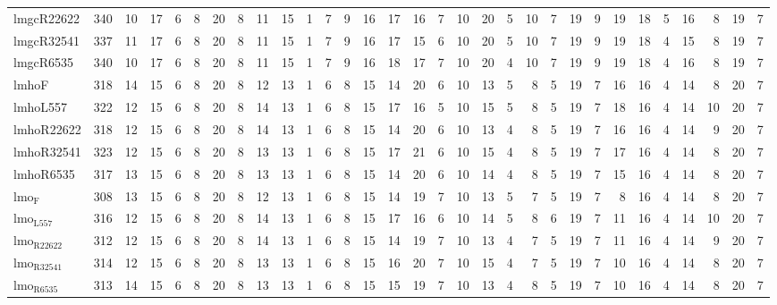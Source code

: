 \begin{center}
\begin{tabular}{lrrrrrrrrrrrrrrrrrrrrrrrrrrrrrr}
lmgcR22622 & 340 & 10 & 17 & 6 & 8 & 20 & 8 & 11 & 15 & 1 & 7 & 9 & 16 & 17 & 16 & 7 & 10 & 20 & 5 & 10 & 7 & 19 & 9 & 19 & 18 & 5 & 16 & 8 & 19 & 7\\
lmgcR32541 & 337 & 11 & 17 & 6 & 8 & 20 & 8 & 11 & 15 & 1 & 7 & 9 & 16 & 17 & 15 & 6 & 10 & 20 & 5 & 10 & 7 & 19 & 9 & 19 & 18 & 4 & 15 & 8 & 19 & 7\\
lmgcR6535 & 340 & 10 & 17 & 6 & 8 & 20 & 8 & 11 & 15 & 1 & 7 & 9 & 16 & 18 & 17 & 7 & 10 & 20 & 4 & 10 & 7 & 19 & 9 & 19 & 18 & 4 & 16 & 8 & 19 & 7\\
lmhoF & 318 & 14 & 15 & 6 & 8 & 20 & 8 & 12 & 13 & 1 & 6 & 8 & 15 & 14 & 20 & 6 & 10 & 13 & 5 & 8 & 5 & 19 & 7 & 16 & 16 & 4 & 14 & 8 & 20 & 7\\
lmhoL557 & 322 & 12 & 15 & 6 & 8 & 20 & 8 & 14 & 13 & 1 & 6 & 8 & 15 & 17 & 16 & 5 & 10 & 15 & 5 & 8 & 5 & 19 & 7 & 18 & 16 & 4 & 14 & 10 & 20 & 7\\
lmhoR22622 & 318 & 12 & 15 & 6 & 8 & 20 & 8 & 14 & 13 & 1 & 6 & 8 & 15 & 14 & 20 & 6 & 10 & 13 & 4 & 8 & 5 & 19 & 7 & 16 & 16 & 4 & 14 & 9 & 20 & 7\\
lmhoR32541 & 323 & 12 & 15 & 6 & 8 & 20 & 8 & 13 & 13 & 1 & 6 & 8 & 15 & 17 & 21 & 6 & 10 & 15 & 4 & 8 & 5 & 19 & 7 & 17 & 16 & 4 & 14 & 8 & 20 & 7\\
lmhoR6535 & 317 & 13 & 15 & 6 & 8 & 20 & 8 & 13 & 13 & 1 & 6 & 8 & 15 & 14 & 20 & 6 & 10 & 14 & 4 & 8 & 5 & 19 & 7 & 15 & 16 & 4 & 14 & 8 & 20 & 7\\
lmo$_{\text{F}}$ & 308 & 13 & 15 & 6 & 8 & 20 & 8 & 12 & 13 & 1 & 6 & 8 & 15 & 14 & 19 & 7 & 10 & 13 & 5 & 7 & 5 & 19 & 7 & 8 & 16 & 4 & 14 & 8 & 20 & 7\\
lmo$_{\text{L557}}$ & 316 & 12 & 15 & 6 & 8 & 20 & 8 & 14 & 13 & 1 & 6 & 8 & 15 & 17 & 16 & 6 & 10 & 14 & 5 & 8 & 6 & 19 & 7 & 11 & 16 & 4 & 14 & 10 & 20 & 7\\
lmo$_{\text{R22622}}$ & 312 & 12 & 15 & 6 & 8 & 20 & 8 & 14 & 13 & 1 & 6 & 8 & 15 & 14 & 19 & 7 & 10 & 13 & 4 & 7 & 5 & 19 & 7 & 11 & 16 & 4 & 14 & 9 & 20 & 7\\
lmo$_{\text{R32541}}$ & 314 & 12 & 15 & 6 & 8 & 20 & 8 & 13 & 13 & 1 & 6 & 8 & 15 & 16 & 20 & 7 & 10 & 15 & 4 & 7 & 5 & 19 & 7 & 10 & 16 & 4 & 14 & 8 & 20 & 7\\
lmo$_{\text{R6535}}$ & 313 & 14 & 15 & 6 & 8 & 20 & 8 & 13 & 13 & 1 & 6 & 8 & 15 & 15 & 19 & 7 & 10 & 13 & 4 & 8 & 5 & 19 & 7 & 10 & 16 & 4 & 14 & 8 & 20 & 7\\
\end{tabular}
\end{center}
